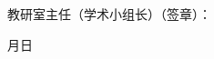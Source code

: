 \documentclass{csustThesis}
\begin{document}
\vspace{-.4\baselineskip}

\begin{ubox}
\begin{center}

	\vspace{4.67\baselineskip}  %

\end{center}

\begin{flushleft}
	教研室主任（学术小组长）（签章）：
\end{flushleft}

\begin{flushright}
	月\hspace{1cm}日\makebox[1.5cm]{}
\end{flushright}

\end{ubox}
\end{document}
